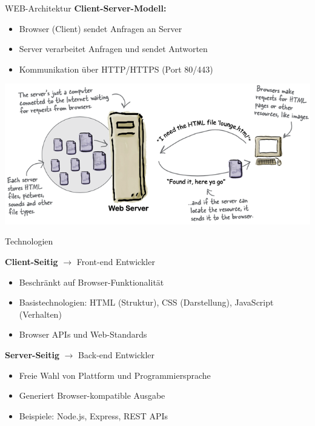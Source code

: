 \begin{definition}{WEB-Architektur}
    \textbf{Client-Server-Modell:}
    \begin{itemize}
        \item Browser (Client) sendet Anfragen an Server
        \item Server verarbeitet Anfragen und sendet Antworten
        \item Kommunikation über HTTP/HTTPS (Port 80/443)
    \end{itemize}
    \includegraphics[width=0.8\linewidth]{images/web_architektur.png}
\end{definition}

\begin{concept}{Technologien}

    \textbf{Client-Seitig} $\rightarrow$ Front-end Entwickler
    \begin{itemize}
        \item Beschränkt auf Browser-Funktionalität
        \item Basistechnologien: HTML (Struktur), CSS (Darstellung), JavaScript (Verhalten)
        \item Browser APIs und Web-Standards
    \end{itemize}

    \textbf{Server-Seitig} $\rightarrow$ Back-end Entwickler
    \begin{itemize}
        \item Freie Wahl von Plattform und Programmiersprache
        \item Generiert Browser-kompatible Ausgabe
        \item Beispiele: Node.js, Express, REST APIs
    \end{itemize}
\end{concept}

